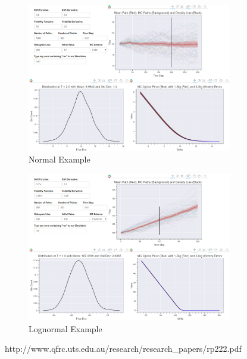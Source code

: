 \documentclass{amsart}
\begin{document}
\begin{figure}[h!]
    \centering
    \includegraphics[width=0.8\textwidth]{fig2.eps}
    \caption{Normal Example}
    \label{fig2}
\end{figure}

\begin{figure}[h!]
    \centering
    \includegraphics[width=0.8\textwidth]{fig3.eps}
    \caption{Lognormal Example}
    \label{fig3}
\end{figure}

\begin{thebibliography}{100}
 http://www.qfrc.uts.edu.au/research/research\_papers/rp222.pdf
\end{thebibliography}
\end{document}
